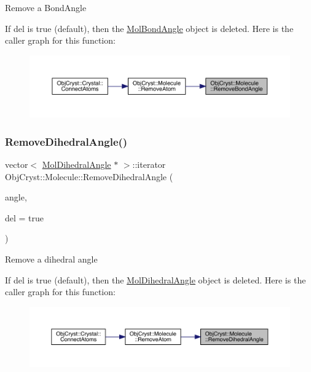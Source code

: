 Remove a Bond\+Angle

If del is true (default), then the \mbox{\hyperlink{class_obj_cryst_1_1_mol_bond_angle}{Mol\+Bond\+Angle}} object is deleted. Here is the caller graph for this function\+:
\nopagebreak
\begin{figure}[H]
\begin{center}
\leavevmode
\includegraphics[width=350pt]{class_obj_cryst_1_1_molecule_a07ae7127f13c0527530074756093a653_icgraph}
\end{center}
\end{figure}
\mbox{\label{class_obj_cryst_1_1_molecule_a5603e0f2c58de705284f07903e4f597a}} 
\subsubsection{\texorpdfstring{RemoveDihedralAngle()}{RemoveDihedralAngle()}}
{\footnotesize\ttfamily vector$<$ \mbox{\hyperlink{class_obj_cryst_1_1_mol_dihedral_angle}{Mol\+Dihedral\+Angle}} $\ast$ $>$\+::iterator Obj\+Cryst\+::\+Molecule\+::\+Remove\+Dihedral\+Angle (\begin{DoxyParamCaption}\item[{const \mbox{\hyperlink{class_obj_cryst_1_1_mol_dihedral_angle}{Mol\+Dihedral\+Angle}} \&}]{angle,  }\item[{const bool}]{del = {\ttfamily true} }\end{DoxyParamCaption})}

Remove a dihedral angle

If del is true (default), then the \mbox{\hyperlink{class_obj_cryst_1_1_mol_dihedral_angle}{Mol\+Dihedral\+Angle}} object is deleted. Here is the caller graph for this function\+:
\nopagebreak
\begin{figure}[H]
\begin{center}
\leavevmode
\includegraphics[width=350pt]{class_obj_cryst_1_1_molecule_a5603e0f2c58de705284f07903e4f597a_icgraph}
\end{center}
\end{figure}
\mbox{\label{class_obj_cryst_1_1_molecule_ab114397cb6637e26e321fb6f580b2e16}} 
